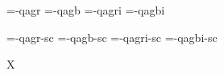 

\ifx\sizespec\undefined \def\sizespec{}\fi
\ifx\font\corkencoded {}\else {}\fi

\ifx\font\unicoded  {} 
\else

\font\tenrm=\tmp-qagr  \sizespec
\font\tenbf=\tmp-qagb  \sizespec
\font\tenit=\tmp-qagri \sizespec
\font\tenbi=\tmp-qagbi \sizespec

\font\tenrmc=\tmp-qagr-sc  \sizespec
\font\tenbfc=\tmp-qagb-sc  \sizespec
\font\tenitc=\tmp-qagri-sc \sizespec
\font\tenbic=\tmp-qagbi-sc \sizespec

\fi

\tenrm

\def\caps#1{{\escapechar=-1 \expandafter}%
  \expandafter\csname\expandafter\tenonlytext\string#1c\endcsname}
\def\tenonlytext{ten}

\ifx\font\corkencoded\else \ifx\font\unicoded\else  \fi\fi

\ifx\mathpreloaded X\else  \fi                     


